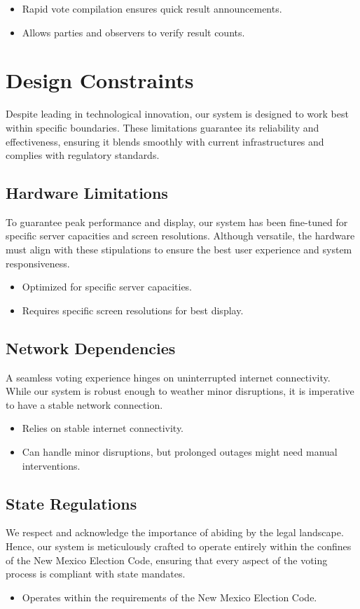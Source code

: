 \documentclass{article}
\begin{document}
\begin{itemize}
    \item Rapid vote compilation ensures quick result announcements.
    \item Allows parties and observers to verify result counts.
\end{itemize}

\section{Design Constraints}
Despite leading in technological innovation, our system is designed to work best within specific boundaries. These limitations guarantee its reliability and effectiveness, ensuring it blends smoothly with current infrastructures and complies with regulatory standards.

\subsection{Hardware Limitations}
To guarantee peak performance and display, our system has been fine-tuned for specific server capacities and screen resolutions. Although versatile, the hardware must align with these stipulations to ensure the best user experience and system responsiveness.

\begin{itemize}
    \item Optimized for specific server capacities.
    \item Requires specific screen resolutions for best display.
\end{itemize}

\subsection{Network Dependencies}
A seamless voting experience hinges on uninterrupted internet connectivity. While our system is robust enough to weather minor disruptions, it is imperative to have a stable network connection.

\begin{itemize}
    \item Relies on stable internet connectivity.
    \item Can handle minor disruptions, but prolonged outages might need manual interventions.
\end{itemize}

\subsection{State Regulations}
We respect and acknowledge the importance of abiding by the legal landscape. Hence, our system is meticulously crafted to operate entirely within the confines of the New Mexico Election Code, ensuring that every aspect of the voting process is compliant with state mandates.

\begin{itemize}
    \item Operates within the requirements of the New Mexico Election Code.
\end{itemize}

\newpage

\printbibliography

{\parindent0pt}
\end{document}
